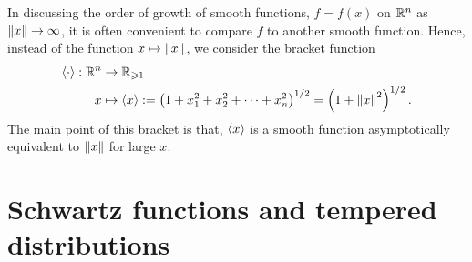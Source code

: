 \documentclass[12pt]{article}
\begin{document}
In discussing the order of growth of smooth functions, $f = f(x)$ on $\R^n$ as $\norm[x] \to \infty$, it is often convenient to compare $f$ to another smooth function. Hence, instead of the function $x \mapsto \norm[x]$, we consider the bracket function 
\begin{align*}
\sym[\cdot] : \R^n &\to \R_{\geq 1} \\
x &\mapsto \sym[x] := \brac{ 1 + x_1^2 + x_2^2 + \dots + x_n^2}^{1/2} = \brac{1 + \norm[x]^2}^{1/2}. 
\end{align*}
The main point of this bracket is that,  $\sym[x]$ is a smooth function asymptotically equivalent to $\norm[x]$ for large $x$. 




\section{Schwartz functions and tempered distributions}
\end{document}
